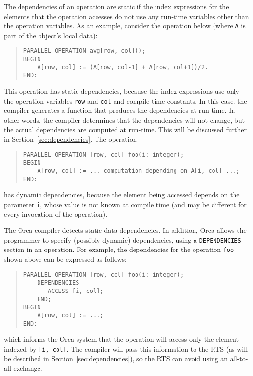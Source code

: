 \documentclass{acmtrans2e}
\begin{document}
The dependencies of an operation are static if
the index expressions for the elements that the operation accesses
do not use any run-time variables other than the operation variables.
As an example, consider the operation below (where \verb+A+
is part of the object's local data):

\begin{quote}
\begin{verbatim}
PARALLEL OPERATION avg[row, col]();
BEGIN
    A[row, col] := (A[row, col-1] + A[row, col+1])/2.
END:
\end{verbatim}
\end{quote}
This operation has static dependencies, because the index expressions
use only the operation variables \verb+row+ and \verb+col+ and
compile-time constants.
In this case, the compiler generates a function that produces the
dependencies at run-time. In other words, the compiler determines that
the dependencies will not change, but the actual dependencies are
computed at run-time. This will be discussed further in
Section~\ref{sec:dependencies}.
The operation

\begin{quote}
\begin{verbatim}
PARALLEL OPERATION [row, col] foo(i: integer);
BEGIN
    A[row, col] := ... computation depending on A[i, col] ...;
END:
\end{verbatim}
\end{quote}
has dynamic dependencies, because
the element being accessed depends on the parameter \verb+i+, whose value
is not known at compile time (and may be different for every invocation of
the operation).

The Orca compiler detects static data dependencies. In addition,
Orca allows the programmer to specify (possibly dynamic) dependencies, 
using a \verb+DEPENDENCIES+ section in an operation.
For example, the dependencies for the operation \verb+foo+ shown above can
be expressed as follows:

\begin{quote}
\begin{verbatim}
PARALLEL OPERATION [row, col] foo(i: integer);
    DEPENDENCIES
       ACCESS [i, col];
    END;
BEGIN
    A[row, col] := ...;
END:
\end{verbatim}
\end{quote}
which informs the Orca system that the operation will
access only the element indexed by \verb+[i, col]+.
The compiler will pass this information to the RTS (as
will be described in Section~\ref{sec:dependencies}), so the RTS
can avoid using an all-to-all exchange.
\end{document}
